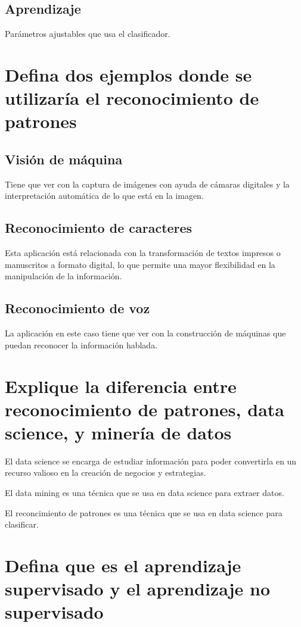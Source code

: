 \documentclass[stu, 12pt, letterpaper, donotrepeattitle, floatsintext, natbib]{apa7}
\begin{document}
        \subsection{Aprendizaje}
            Parámetros ajustables que usa el clasificador.

    \section{Defina dos ejemplos donde se utilizaría el reconocimiento de patrones}
        \subsection{Visión de máquina}
            Tiene que ver con la captura de imágenes con ayuda de cámaras digitales y la interpretación automática de lo que está en la imagen.

        \subsection{Reconocimiento de caracteres}
            Esta aplicación está relacionada con la transformación de textos impresos o manuscritos a formato digital, lo que permite una mayor flexibilidad en la manipulación de la información.

        \subsection{Reconocimiento de voz}
            La aplicación en este caso tiene que ver con la construcción de máquinas que puedan reconocer la información hablada.

    \section{Explique la diferencia entre reconocimiento de patrones, data science, y minería de datos}
        El data science se encarga de estudiar información para poder convertirla en un recurso valioso en la creación de negocios y estrategias.

        El data mining es una técnica que se usa en data science para extraer datos.

        El reconcimiento de patrones es una técnica que se usa en data science para clasificar.

    \section{Defina que es el aprendizaje supervisado y el aprendizaje no supervisado}
\end{document}

